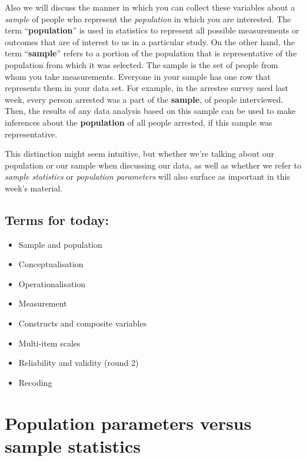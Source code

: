 \documentclass[
]{book}
\providecommand{\tightlist}{%
  \setlength{\itemsep}{0pt}\setlength{\parskip}{0pt}}
\begin{document}
Also we will discuss the manner in which you can collect these variables about a \emph{sample} of people who represent the \emph{population} in which you are interested. The term ``\textbf{population}'' is used in statistics to represent all possible measurements or outcomes that are of interest to us in a particular study. On the other hand, the term ``\textbf{sample}'' refers to a portion of the population that is representative of the population from which it was selected. The sample is the set of people from whom you take measurements. Everyone in your sample has one row that represents them in your data set. For example, in the arrestee survey used last week, every person arrested was a part of the \textbf{sample}, of people interviewed. Then, the results of any data analysis based on this sample can be used to make inferences about the \textbf{population} of all people arrested, if this sample was representative.

This distinction might seem intuitive, but whether we're talking about our population or our sample when discussing our data, as well as whether we refer to \emph{sample statistics} or \emph{population parameters} will also surface as important in this week's material.

\hypertarget{terms-for-today-2}{%
\subsection{Terms for today:}\label{terms-for-today-2}}

\begin{itemize}
\tightlist
\item
  Sample and population
\item
  Conceptualisation
\item
  Operationalisation
\item
  Measurement
\item
  Constructs and composite variables
\item
  Multi-item scales
\item
  Reliability and validity (round 2)
\item
  Recoding
\end{itemize}

\hypertarget{population-parameters-versus-sample-statistics}{%
\section{Population parameters versus sample statistics}\label{population-parameters-versus-sample-statistics}}
\end{document}
